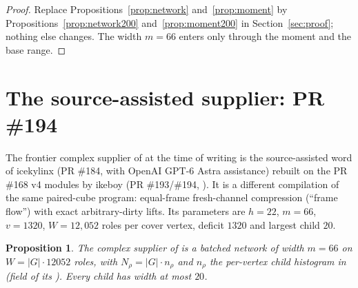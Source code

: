 \documentclass[11pt]{article}
\newtheorem{proposition}[theorem]{Proposition}
\theoremstyle{definition}
\begin{document}
\begin{proof}
Replace Propositions~\ref{prop:network} and~\ref{prop:moment} by
Propositions~\ref{prop:network200} and~\ref{prop:moment200} in
Section~\ref{sec:proof}; nothing else changes. The width $m=66$ enters only
through the moment and the base range.
\end{proof}

\section{The source-assisted supplier: PR \#194}\label{sec:pr194}
The frontier complex supplier of \cite{cms} at the time of writing is the
source-assisted word of icekylinx (PR \#184, with OpenAI GPT-6 Astra assistance)
rebuilt on the PR \#168 v4 modules by ikeboy (PR \#193/\#194, \cite{pr194}). It
is a different compilation of the same paired-cube program: equal-frame
fresh-channel compression (``frame flow'') with exact arbitrary-dirty lifts.
Its parameters are $h=22$, $m=66$, $v=1320$, $W=12{,}052$ roles per cover
vertex, deficit $1320$ and largest child $20$.

\begin{proposition}\label{prop:network194}
The complex supplier of \cite{pr194} is a batched network of width $m=66$ on
$W=|G|\cdot12052$ roles, with $N_\rho=|G|\cdot n_\rho$ and $n_\rho$ the
per-vertex child histogram in 
(field  of its ). Every child has
width at most $20$.
\end{proposition}
\end{document}
